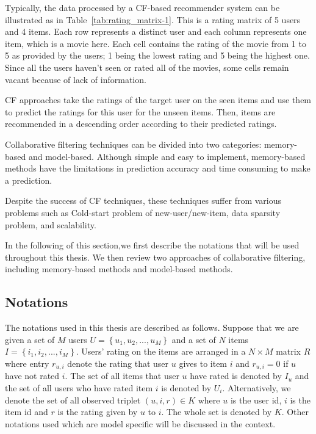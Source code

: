 \documentclass[oneside,13pt]{extreport}
\begin{document}
Typically, the data processed by a CF-based recommender system can be illustrated as in Table~\ref{tab:rating_matrix-1}. This is a rating matrix of 5 users and 4 items. Each row represents a distinct user and each column represents one item, which is a movie here. Each cell contains the rating of the movie from 1 to 5 as provided by the users; 1 being the lowest rating and 5 being the highest one. Since all the users haven't seen or rated all of the movies, some cells remain vacant because of lack of information. 

CF approaches take the ratings of the target user on the seen items and use them to predict the ratings for this user for the unseen items. Then, items are recommended in a descending order according to their predicted ratings.

Collaborative filtering techniques can be divided into two categories: memory-based and model-based. Although simple and easy to implement, memory-based methods have the limitations in prediction accuracy and time consuming to make a prediction. 

Despite the success of CF techniques, these techniques suffer from various problems such as Cold-start problem of new-user/new-item, data sparsity problem, and scalability.

In the following of this section,we first describe the notations that will be used throughout this thesis. We then review two approaches
of collaborative filtering, including memory-based methods and model-based methods.

\subsection{Notations}
The notations used in this thesis are described as follows. Suppose that we are given
a set of $M$ users $U = \left\{ {{u_1},{u_2},...,{u_M}} \right\}$ and a set of $N$ items $I = \left\{ {{i_1},{i_2},...,{i_M}} \right\}$. Users’ rating on the items are arranged in a $N \times M$ matrix $R$ where entry $r_{u,i}$ denote the rating that user $u$ gives to item
$i$ and $r_{u,i} = 0$ if $u$ have not rated $i$. The set of all items that user $u$
have rated is denoted by $I_u$ and the set of all users who have rated item $i$ is denoted by $U_i$. Alternatively, we denote the set of all observed
triplet $\left( {u,i,r} \right) \in K$  where $u$ is the user id, $i$ is the item id
and $r$ is the rating given by $u$ to $i$. The whole set is denoted by $K$.
Other notations used which are model specific will be discussed in the context. 
\end{document}
